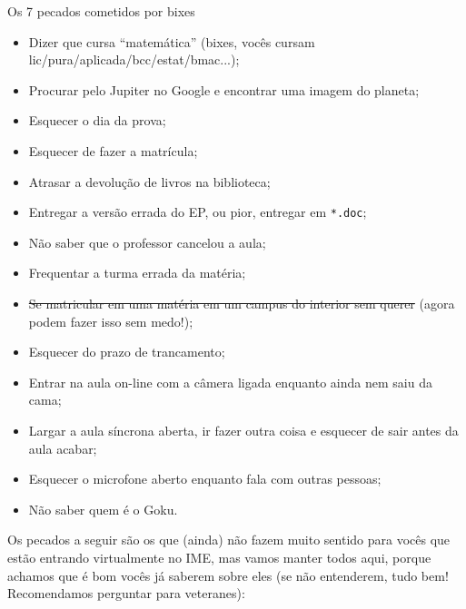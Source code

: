\begin{editorial}{Os 7 pecados cometidos por bixes}

\begin{itemize}
  \item Dizer que cursa ``matemática'' (bixes, vocês cursam
        lic/pura/aplicada/bcc/estat/bmac...);
  \item Procurar pelo Jupiter no Google e encontrar uma imagem do planeta;
  \item Esquecer o dia da prova;
  \item Esquecer de fazer a matrícula;
  \item Atrasar a devolução de livros na biblioteca;
  \item Entregar a versão errada do EP, ou pior, entregar em \texttt{*.doc};
  \item Não saber que o professor cancelou a aula;
  \item Frequentar a turma errada da matéria;
  \item \sout{Se matricular em uma matéria em um campus do interior sem querer}
        (agora podem fazer isso sem medo!);
  \item Esquecer do prazo de trancamento;
  \item Entrar na aula on-line com a câmera ligada enquanto ainda nem saiu da cama;
  \item Largar a aula síncrona aberta, ir fazer outra coisa e esquecer de sair antes da aula acabar;
  \item Esquecer o microfone aberto enquanto fala com outras pessoas;
  \item Não saber quem é o Goku.
\end{itemize}
Os pecados a seguir são os que (ainda) não fazem muito sentido para vocês que
estão entrando virtualmente no IME, mas vamos manter todos aqui, porque
achamos que é bom vocês já saberem sobre eles (se não entenderem,
tudo bem! Recomendamos perguntar para veteranes):


\end{editorial}

